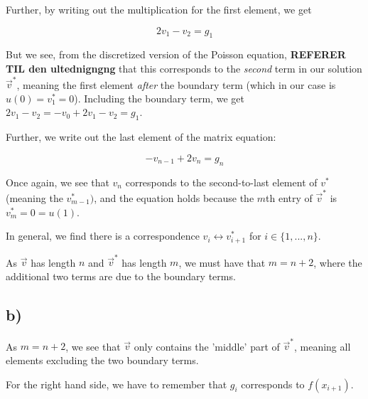 \documentclass[english,notitlepage]{revtex4-1}  %
\begin{document}
    Further, by writing out the multiplication for the first element, we get

    \begin{equation}
      2 v_1 - v_2 = g_1  \label{eqn:v_0}
    \end{equation}

    But we see, from the discretized version of the Poisson equation, \textbf{REFERER TIL den ultednigngng } that this corresponds to the \emph{second} term in our solution $\vec{v}^*$, meaning the first element \emph{after} the boundary term (which in our case is $u(0) = v^*_1 = 0$). Including the boundary term, we get $2 v_1 - v_2 = -v_{0} + 2 v_1 - v_2 = g_1 $.

    Further, we write out the last element of the matrix equation:

    \begin{equation}
      -v_{n-1} + 2 v_n = g_n \label{eqn:v_n}
    \end{equation}

    Once again, we see that $v_n$ corresponds to the second-to-last element of $v^*$ (meaning the $v^*_{m-1})$, and the equation holds because the $m$th entry of $\vec{v}^*$ is $v^*_m = 0 = u(1)$.


    In general, we find there is a correspondence $v_i \longleftrightarrow v^*_{i+1}$ for $i \in \{1, ..., n\}$.

    As $\vec{v}$ has length $n$ and $\vec{v}^*$ has length $m$, we must have that $m = n+2$, where the additional two terms are due to the boundary terms.


  \subsection*{b)}

    As $m = n+2$, we see that $\vec{v}$ only contains the 'middle' part of $\vec{v}^*$, meaning all elements excluding the two boundary terms.

    For the right hand side, we have to remember that $g_i$ corresponds to $f(x_{i+1})$.
\end{document}
